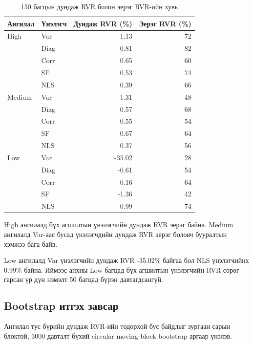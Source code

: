 \begin{table}[htbp]
	\centering
	\caption{150 багцын дундаж RVR болон эерэг RVR-ийн хувь}
	\label{tab:robustness_rvr}
	\small
	\begin{tabular}{llrr}
		\hline
		Ангилал & Үнэлэгч &
		Дундаж RVR (\%) & Эерэг RVR (\%)\\
		\hline
		High & Var  & 1.13 & 72\\
		& Diag & 0.81 & 82\\
		& Corr & 0.65 & 60\\
		& SF   & 0.53 & 74\\
		& NLS  & 0.39 & 66\\
		\hline
		Medium & Var  & -1.31 & 48\\
		& Diag & 0.57 & 68\\
		& Corr & 0.55 & 54\\
		& SF   & 0.67 & 64\\
		& NLS  & 0.37 & 56\\
		\hline
		Low & Var  & -35.02 & 28\\
		& Diag & -0.61 & 54\\
		& Corr & 0.16 & 64\\
		& SF   & -1.36 & 42\\
		& NLS  & 0.99 & 74\\
		\hline
	\end{tabular}
\end{table}

High ангилалд бүх агшилтын үнэлэгчийн
дундаж RVR эерэг байна. Medium ангилалд
Var-аас бусад үнэлэгчдийн дундаж RVR
эерэг боловч бууралтын хэмжээ бага байв.

Low ангилалд Var үнэлэгчийн дундаж
RVR -35.02\% байгаа бол NLS үнэлэгчийнх
0.99\% байна. Иймээс анхны Low багцад
бүх агшилтын үнэлэгчийн RVR сөрөг
гарсан үр дүн нэмэлт 50 багцад
бүрэн давтагдсангүй.

\subsection{Bootstrap итгэх завсар}
\label{subsec:bootstrap_results}

Ангилал тус бүрийн дундаж RVR-ийн
тодорхой бус байдлыг зургаан сарын
блоктой, 3000 давталт бүхий circular
moving-block bootstrap аргаар үнэлэв.

